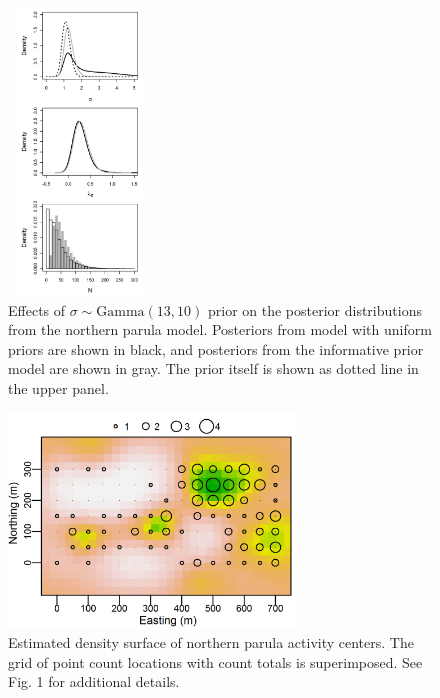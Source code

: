 
\begin{figure}
  \centering
  \includegraphics[width=1.5in,height=3in]{Ch18-Unmarked/figs/prior} %
  \caption{Effects of $\sigma \sim \mbox{Gamma}(13,10)$
    prior on the posterior distributions from the northern parula
    model. Posteriors from model with uniform priors are
    shown in black, and posteriors from the informative prior model
    are shown in gray. The prior itself is shown as dotted line in the
    upper panel.}
  \label{fig:prior}
\end{figure}




\begin{figure}
  \centering
  \includegraphics[width=3in,height=2.25in]{Ch18-Unmarked/figs/nopaDen}
  \caption{Estimated density surface of northern parula activity
    centers. The grid of point count locations with count totals is
    superimposed. See Fig. 1 for additional details.  }
  \label{fig:nopaDen}
\end{figure}




